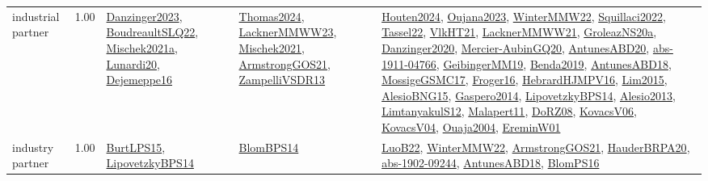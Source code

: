 {\begin{longtable}{p{3cm}r>{\raggedright\arraybackslash}p{6cm}>{\raggedright\arraybackslash}p{6cm}>{\raggedright\arraybackslash}p{8cm}}
\index{industrial partner}\index{Benchmarks!industrial partner}industrial partner &  1.00 & \hyperref[detail:Danzinger2023]{Danzinger2023}, \hyperref[detail:BoudreaultSLQ22]{BoudreaultSLQ22}, \hyperref[detail:Mischek2021a]{Mischek2021a}, \hyperref[detail:Lunardi20]{Lunardi20}, \hyperref[detail:Dejemeppe16]{Dejemeppe16} & \hyperref[detail:Thomas2024]{Thomas2024}, \hyperref[detail:LacknerMMWW23]{LacknerMMWW23}, \hyperref[detail:Mischek2021]{Mischek2021}, \hyperref[detail:ArmstrongGOS21]{ArmstrongGOS21}, \hyperref[detail:ZampelliVSDR13]{ZampelliVSDR13} & \hyperref[detail:Houten2024]{Houten2024}, \hyperref[detail:Oujana2023]{Oujana2023}, \hyperref[detail:WinterMMW22]{WinterMMW22}, \hyperref[detail:Squillaci2022]{Squillaci2022}, \hyperref[detail:Tassel22]{Tassel22}, \hyperref[detail:VlkHT21]{VlkHT21}, \hyperref[detail:LacknerMMWW21]{LacknerMMWW21}, \hyperref[detail:GroleazNS20a]{GroleazNS20a}, \hyperref[detail:Danzinger2020]{Danzinger2020}, \hyperref[detail:Mercier-AubinGQ20]{Mercier-AubinGQ20}, \hyperref[detail:AntunesABD20]{AntunesABD20}, \hyperref[detail:abs-1911-04766]{abs-1911-04766}, \hyperref[detail:GeibingerMM19]{GeibingerMM19}, \hyperref[detail:Benda2019]{Benda2019}, \hyperref[detail:AntunesABD18]{AntunesABD18}, \hyperref[detail:MossigeGSMC17]{MossigeGSMC17}, \hyperref[detail:Froger16]{Froger16}, \hyperref[detail:HebrardHJMPV16]{HebrardHJMPV16}, \hyperref[detail:Lim2015]{Lim2015}, \hyperref[detail:AlesioBNG15]{AlesioBNG15}, \hyperref[detail:Gaspero2014]{Gaspero2014}, \hyperref[detail:LipovetzkyBPS14]{LipovetzkyBPS14}, \hyperref[detail:Alesio2013]{Alesio2013}, \hyperref[detail:LimtanyakulS12]{LimtanyakulS12}, \hyperref[detail:Malapert11]{Malapert11}, \hyperref[detail:DoRZ08]{DoRZ08}, \hyperref[detail:KovacsV06]{KovacsV06}, \hyperref[detail:KovacsV04]{KovacsV04}, \hyperref[detail:Ouaja2004]{Ouaja2004}, \hyperref[detail:EreminW01]{EreminW01}\\
\index{industry partner}\index{Benchmarks!industry partner}industry partner &  1.00 & \hyperref[detail:BurtLPS15]{BurtLPS15}, \hyperref[detail:LipovetzkyBPS14]{LipovetzkyBPS14} & \hyperref[detail:BlomBPS14]{BlomBPS14} & \hyperref[detail:LuoB22]{LuoB22}, \hyperref[detail:WinterMMW22]{WinterMMW22}, \hyperref[detail:ArmstrongGOS21]{ArmstrongGOS21}, \hyperref[detail:HauderBRPA20]{HauderBRPA20}, \hyperref[detail:abs-1902-09244]{abs-1902-09244}, \hyperref[detail:AntunesABD18]{AntunesABD18}, \hyperref[detail:BlomPS16]{BlomPS16}\\

\end{longtable}}
